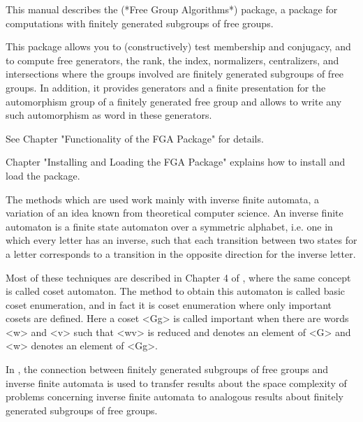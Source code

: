 



This manual describes the {\FGA} (*Free Group Algorithms*) package,
a {\GAP} package for computations with finitely generated subgroups of
free groups.

This package allows you to (constructively) test membership and
conjugacy, and to compute free generators, the rank, the index,
normalizers, centralizers, and intersections
where the groups involved are finitely generated subgroups of free groups.
%
In addition, it provides generators and a finite presentation for the
automorphism group of a finitely generated free group and allows to
write any such automorphism as word in these generators.

See Chapter "Functionality of the FGA Package" for details.

Chapter "Installing and Loading the FGA Package" explains
how to install and load the {\FGA} package.


The methods which are used work mainly with inverse finite automata,
a variation of an idea known from theoretical computer science.
An inverse finite automaton is a finite state automaton over a
symmetric alphabet, i.e. one in which every letter has an inverse,
such that each transition between two states for a letter corresponds
to a transition in the opposite direction for the inverse letter.

Most of these techniques are described in Chapter 4 of \cite{Sims94},
where the same concept is called coset automaton.
The method to obtain this automaton is called basic coset enumeration,
and in fact it is coset enumeration where only important cosets are
defined.  Here a coset <Gg> is called important when there
are words <w> and <v> such that <wv> is reduced and denotes an element
of <G> and <w> denotes an element of <Gg>.

In \cite{BirgetEtAl00}, the connection between finitely generated
subgroups of free groups and inverse finite automata is used to transfer
results about the space complexity of problems concerning inverse finite
automata to analogous results about finitely generated subgroups of free
groups.


